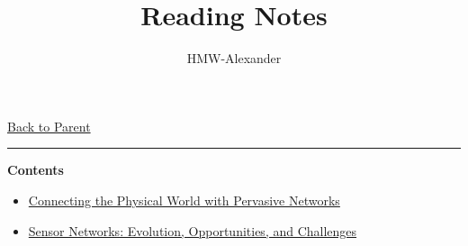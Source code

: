\documentclass[letterpaper,11pt]{article}
\title{\textbf{Reading Notes}}
\author{HMW-Alexander}
\newcommand{\panhline}{\begin{center}\rule{\textwidth}{1pt}\end{center}}
\begin{document}
\maketitle
\href{../index.html}{Back to Parent}

\panhline
\textbf{Contents}

\begin{itemize}
	\item \href{./ConnectingThePhysicalWorldWithPervasiveNetworks/document.html}{Connecting the Physical World with Pervasive Networks}
	\item \href{./SensorNetworkEvolutionOpportunitiesAndChallenges/document.html}{Sensor Networks: Evolution, Opportunities, and Challenges}
\end{itemize}
\end{document}
